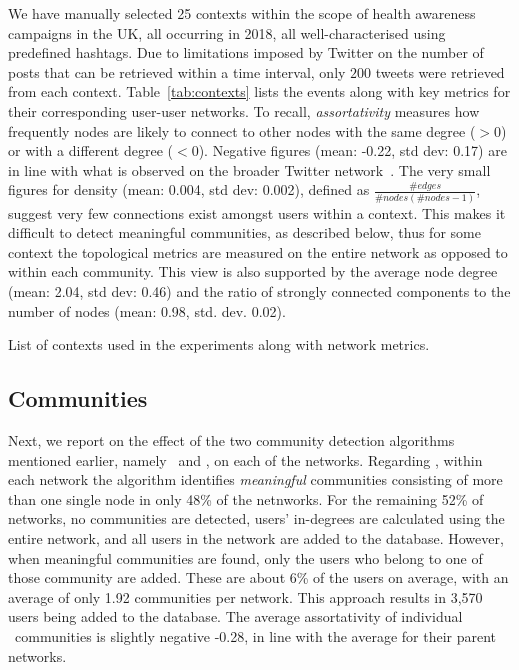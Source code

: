 We have manually selected 25 contexts within the scope of health awareness campaigns in the UK, all occurring in 2018, all well-characterised using predefined hashtags.
Due to limitations imposed by Twitter on the number of posts that can be retrieved within a time interval, only $200$ tweets were retrieved from each context.
 Table~\ref{tab:contexts} lists the events along with key metrics for their corresponding user-user networks. 
To recall, \textit{assortativity} measures how frequently nodes are likely to connect to other nodes with the same degree ($>0$) or with a different degree ($<0$). 
Negative figures (mean: -0.22, std dev: 0.17) are in line with what is observed on the broader Twitter network~\cite{Fisher2017}.
%
The very small figures for density (mean: 0.004, std dev: 0.002), defined as $\frac{\#edges }{\mathit{\mathit{\#nodes}} (\mathit{\#nodes} -1)}$, suggest very few connections exist amongst users within a context. 
This makes it difficult to detect meaningful communities, as described below, thus for some context the topological metrics are measured on the entire network as opposed to within each community.
This view is also supported by the average node degree (mean: 2.04, std dev: 0.46) and the ratio of strongly connected components to the number of nodes (mean: 0.98, std. dev. 0.02).

\begin{table}
	\resizebox{\textwidth}{!}{
	    
	}
	\caption{List of contexts used in the experiments along with network metrics.}
	\label{tab:contexts}
\end{table}

\subsection{Communities}  \label{sec:communities}

Next, we report on the effect of the two community detection algorithms mentioned earlier, namely \demon~and \infomap, on each of the networks. 
%
Regarding \demon, within each network the algorithm  identifies \textit{meaningful} communities consisting of more than one single node in only 48\% of the netnworks.
For the remaining 52\% of networks, no communities are detected, users' in-degrees are calculated using the entire network, and all users in the network are added to the database.
%
However, when meaningful communities are found, only the users who belong to one of those community are added. 
These are about 6\% of the users on average, with an average of only 1.92 communities per network.
%
This approach results in 3,570 users being added to the database.
The average assortativity of individual \demon~communities is slightly negative -0.28, in line with the average for their parent networks.

